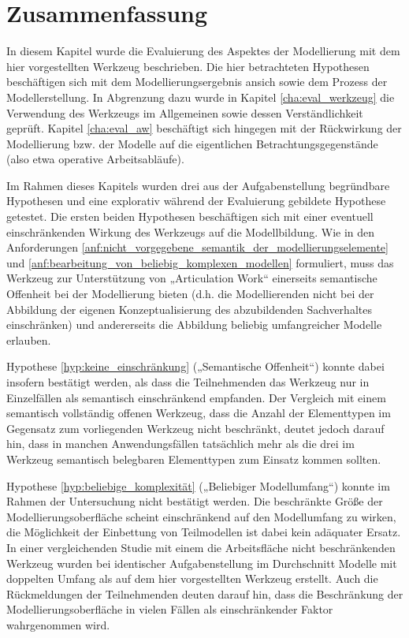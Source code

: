 
\section{Zusammenfassung} %
\label{sec:m_zusammenfassung}

In diesem Kapitel wurde die Evaluierung des Aspektes der Modellierung mit dem hier vorgestellten Werkzeug beschrieben. Die hier betrachteten Hypothesen beschäftigen sich mit dem Modellierungsergebnis ansich sowie dem Prozess der Modellerstellung. In Abgrenzung dazu wurde in Kapitel \ref{cha:eval_werkzeug} die Verwendung des Werkzeugs im Allgemeinen sowie dessen Verständlichkeit geprüft. Kapitel \ref{cha:eval_aw} beschäftigt sich hingegen mit der Rückwirkung der Modellierung bzw. der Modelle auf die eigentlichen Betrachtungsgegenstände (also etwa operative Arbeitsabläufe).

Im Rahmen dieses Kapitels wurden drei aus der Aufgabenstellung begründbare Hypothesen und eine explorativ während der Evaluierung gebildete Hypothese getestet. Die ersten beiden Hypothesen beschäftigen sich mit einer eventuell einschränkenden Wirkung des Werkzeugs auf die Modellbildung. Wie in den Anforderungen \ref{anf:nicht_vorgegebene_semantik_der_modellierungselemente} und \ref{anf:bearbeitung_von_beliebig_komplexen_modellen} formuliert, muss das Werkzeug zur Unterstützung von „Articulation Work“ einerseits semantische Offenheit bei der Modellierung bieten (d.h. die Modellierenden nicht bei der Abbildung der eigenen Konzeptualisierung des abzubildenden Sachverhaltes einschränken) und andererseits die Abbildung beliebig umfangreicher Modelle erlauben. 

Hypothese \ref{hyp:keine_einschränkung} („Semantische Offenheit“) konnte dabei insofern bestätigt werden, als dass die Teilnehmenden das Werkzeug nur in Einzelfällen als semantisch einschränkend empfanden. Der Vergleich mit einem semantisch vollständig offenen Werkzeug, dass die Anzahl der Elementtypen im Gegensatz zum vorliegenden Werkzeug nicht beschränkt, deutet jedoch darauf hin, dass in manchen Anwendungsfällen tatsächlich mehr als die drei im Werkzeug semantisch belegbaren Elementtypen zum Einsatz kommen sollten.  

Hypothese \ref{hyp:beliebige_komplexität} („Beliebiger Modellumfang“) konnte im Rahmen der Untersuchung nicht bestätigt werden. Die beschränkte Größe der Modellierungsoberfläche scheint einschränkend auf den Modellumfang zu wirken, die Möglichkeit der Einbettung von Teilmodellen ist dabei kein adäquater Ersatz. In einer vergleichenden Studie mit einem die Arbeitsfläche nicht beschränkenden Werkzeug wurden bei identischer Aufgabenstellung im Durchschnitt Modelle mit doppelten Umfang als auf dem hier vorgestellten Werkzeug erstellt. Auch die Rückmeldungen der Teilnehmenden deuten darauf hin, dass die Beschränkung der Modellierungsoberfläche in vielen Fällen als einschränkender Faktor wahrgenommen wird.

